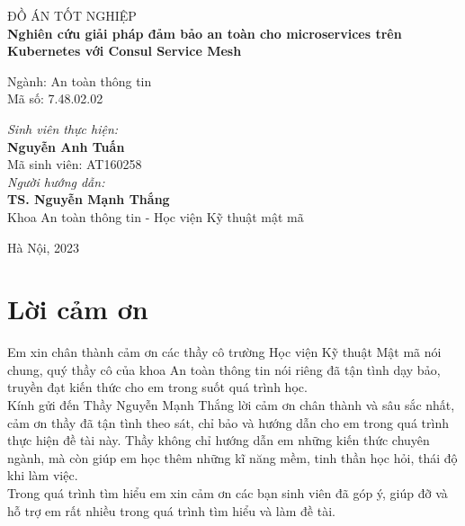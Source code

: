 \documentclass[14pt,a4paper]{report}
\begin{document}
\begin{titlepage}
		\begin{center}
			{\Huge ĐỒ ÁN TỐT NGHIỆP\\}
			\bigskip
			\large \textbf{Nghiên cứu giải pháp đảm bảo an toàn cho microservices trên Kubernetes với Consul Service Mesh}
		\end{center}
		\bigskip
		\begin{center}
			\large{Ngành: An toàn thông tin}\\
			\large{Mã số: 7.48.02.02}\\
		\end{center}
		\vspace{30mm}
		\begin{flushleft}
			\textit{Sinh viên thực hiện:}\\
			\textbf{Nguyễn Anh Tuấn}\\
			Mã sinh viên: AT160258\\
			\bigskip
			\textit{Người hướng dẫn:}\\
			\textbf{TS. Nguyễn Mạnh Thắng}\\
			Khoa An toàn thông tin - Học viện Kỹ thuật mật mã
		\end{flushleft}
		\vfill
		\begin{center}
			Hà Nội, 2023
		\end{center}
		
	\end{titlepage}
	
	\tableofcontents
	\listoffigures
	\chapter*{\centering Lời cảm ơn}
	\hspace{1cm}Em xin chân thành cảm ơn các thầy cô trường Học viện Kỹ thuật Mật mã nói chung, quý thầy cô của khoa An toàn thông tin nói riêng đã tận tình dạy bảo, truyền đạt kiến thức cho em trong suốt quá trình học.\\
	
	\hspace{0.3cm} Kính gửi đến Thầy Nguyễn Mạnh Thắng lời cảm ơn chân thành và sâu sắc nhất, cảm ơn thầy đã tận tình theo sát, chỉ bảo và hướng dẫn cho em trong quá trình thực hiện đề tài này. Thầy không chỉ hướng dẫn em những kiến thức chuyên ngành, mà còn giúp  em học thêm những kĩ năng mềm, tinh thần học hỏi, thái độ khi làm việc.\\
	
	\hspace{0.3cm}Trong quá trình tìm hiểu em xin cảm ơn các bạn sinh viên đã góp ý, giúp đỡ và hỗ trợ em rất nhiều trong quá trình tìm hiểu và làm đề tài.\\
	
\end{document}
